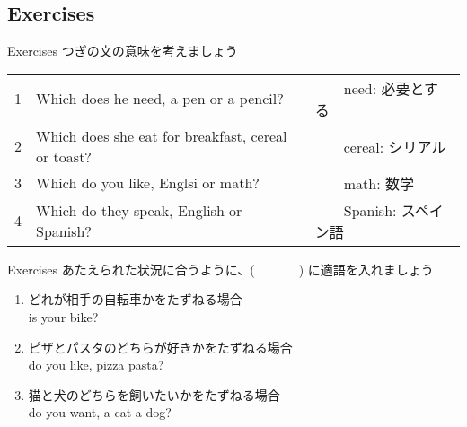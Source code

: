 \documentclass[aspectratio=169,xcolor={dvipsnames,table}]{beamer}
\begin{document}
\subsection{Exercises}
\begin{frame}[plain]{Exercises}
つぎの文の意味を考えましょう

\begin{tabular}{rll}
1& Which does he need, a pen or a pencil? &　　{\small need: 必要とする} \\
2&Which does she eat for breakfast, cereal or toast? & 　　{\small cereal: シリアル}\\
3& Which do you like, Englsi or math? & 　　{\small math: 数学}\\
4& Which do they speak, English or Spanish?&　　{\small Spanish: スペイン語} \\
\end{tabular}

\mbox{}\hfill{}
\end{frame}
\begin{frame}[plain]{Exercises}
 あたえられた状況に合うように、(~~~~~~~) に適語を入れましょう

\begin{enumerate}
 \item どれが相手の自転車かをたずねる場合\\
 is your bike?
 \item ピザとパスタのどちらが好きかをたずねる場合\\
 do you like, pizza  pasta?
 \item 猫と犬のどちらを飼いたいかをたずねる場合\\
 do you want, a cat  a dog?
\end{enumerate}

\mbox{}\hfill{}

\end{frame}
\end{document}
